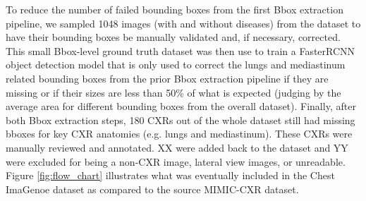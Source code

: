 To reduce the number of failed bounding boxes from the first Bbox extraction pipeline, we sampled 1048 images (with and without diseases) from the dataset to have their bounding boxes be manually validated and, if necessary, corrected. This small Bbox-level ground truth dataset was then use to train a FasterRCNN object detection model that is only used to correct the lungs and mediastinum related bounding boxes from the prior Bbox extraction pipeline if they are missing or if their sizes are less than 50\% of what is expected (judging by the average area for different bounding boxes from the overall dataset). Finally, after both Bbox extraction steps, 180 CXRs out of the whole dataset still had missing bboxes for key CXR anatomies (e.g. lungs and mediastinum). These CXRs were manually reviewed and annotated. XX were added back to the dataset and YY were excluded for being a non-CXR image, lateral view images, or unreadable. Figure \ref{fig:flow_chart} illustrates what was eventually included in the Chest ImaGenoe dataset as compared to the source MIMIC-CXR dataset.